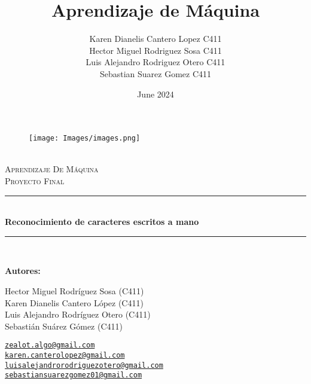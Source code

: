 \documentclass{article}
\title{Aprendizaje de Máquina}
\author{Karen Dianelis Cantero Lopez C411 \\ Hector Miguel Rodriguez Sosa C411 \\ Luis Alejandro Rodriguez Otero C411 \\ Sebastian Suarez Gomez C411 }
\date{June 2024}
\newcommand{\HRule}{\rule{\linewidth}{0.5mm}} %
\begin{document}
\begin{center}
    \begin{figure}
        \vspace{-1.0cm}
        \texttt{[image: Images/images.png]} %
    \end{figure}
    \mbox{}\\[2.0cm]
    \textsc{\Huge Aprendizaje De Máquina}\\[2.5cm]
    \textsc{\LARGE Proyecto Final }\\[2.0cm]
    \HRule\\[0.4cm]
    {\large \bf {Reconocimiento de caracteres escritos a mano} }\\[0.2cm]
    \HRule\\[1.5cm]
\end{center}

\begin{flushleft}
    \textbf{Autores:}
\end{flushleft}

\begin{center}
    \begin{minipage}{0.5\textwidth}
        \begin{flushleft}
            Hector Miguel Rodríguez Sosa (C411)\\
            Karen Dianelis Cantero López (C411)\\
            Luis Alejandro Rodríguez Otero (C411)\\
            Sebastián Suárez Gómez (C411)\\
        \end{flushleft}
    \end{minipage}%
    \begin{minipage}{0.5\textwidth}
        \begin{flushright}
            \href{mailto:zealot.algo@gmail.com}
            {\texttt{zealot.algo@gmail.com}}\\
            \href{mailto:karen.canterolopez@gmail.com}{\texttt{karen.canterolopez@gmail.com}}\\
            \href{mailto:luisalejandrorodriguezotero@gmail.com}
            {\texttt{luisalejandrorodriguezotero@gmail.com}}\\
            \href{mailto:sebastiansuarezgomez01@gmail.com}
            {\texttt{sebastiansuarezgomez01@gmail.com}}\\
        \end{flushright}
    \end{minipage}
\end{center}
    
\end{document}
